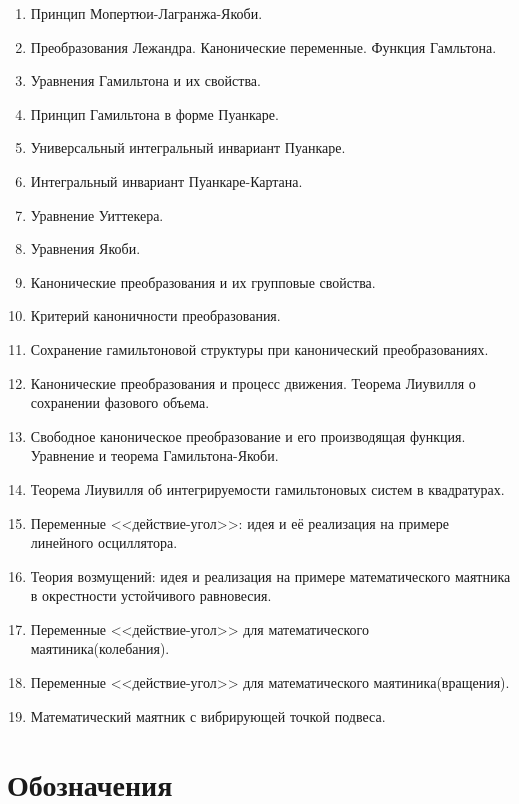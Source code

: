 \documentclass[a4paper,12pt]{article}
\begin{document}
\begin{enumerate}
\item Принцип Мопертюи-Лагранжа-Якоби.
\item Преобразования Лежандра. Канонические переменные. Функция Гамльтона.
\item Уравнения Гамильтона и их свойства.
\item Принцип Гамильтона в форме Пуанкаре.
\item Универсальный интегральный инвариант Пуанкаре.
\item Интегральный инвариант Пуанкаре-Картана.
\item Уравнение Уиттекера.
\item Уравнения Якоби.
\item Канонические преобразования и их групповые свойства.
\item Критерий каноничности преобразования.
\item Сохранение гамильтоновой структуры при канонический преобразованиях.
\item Канонические преобразования и процесс движения. Теорема Лиувилля
  о сохранении фазового объема.
\item Свободное каноническое преобразование и его производящая
  функция. Уравнение и теорема Гамильтона-Якоби.
\item Теорема Лиувилля об интегрируемости гамильтоновых систем в квадратурах.
\item Переменные <<действие-угол>>: идея и её реализация на примере линейного осциллятора.
\item Теория возмущений: идея и реализация на примере математического
  маятника в окрестности устойчивого равновесия.
\item Переменные <<действие-угол>> для математического маятиника(колебания).
\item Переменные <<действие-угол>> для математического маятиника(вращения).
\item Математический маятник с вибрирующей точкой подвеса.
\end{enumerate}
\section*{Обозначения}
\end{document}
